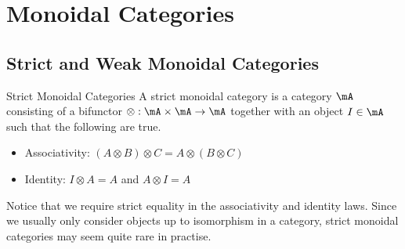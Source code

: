 \documentclass[a4paper]{article}
\begin{document}
\pagebreak
\section{Monoidal Categories}
\subsection{Strict and Weak Monoidal Categories}
\begin{defn}{Strict Monoidal Categories}{} A strict monoidal category is a category $\mA$ consisting of a bifunctor $\otimes:\mA\times\mA\to\mA$ together with an object $I\in\mA$ such that the following are true. 
\begin{itemize}
\item Associativity: $(A\otimes B)\otimes C=A\otimes(B\otimes C)$
\item Identity: $I\otimes A=A$ and $A\otimes I=A$
\end{itemize}
\end{defn}

Notice that we require strict equality in the associativity and identity laws. Since we usually only consider objects up to isomorphism in a category, strict monoidal categories may seem quite rare in practise. 
\end{document}
